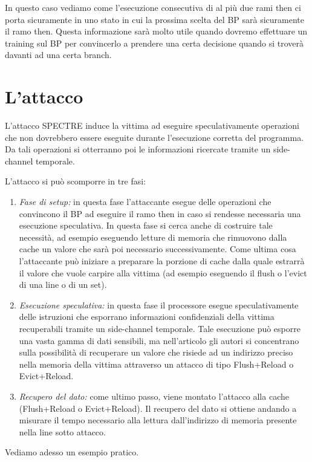 			In questo caso vediamo come l'esecuzione consecutiva di al più due rami then ci porta sicuramente in uno stato in cui la prossima scelta del \ac{BP} sarà sicuramente il ramo then. Questa informazione sarà molto utile quando dovremo effettuare un training sul \ac{BP} per convincerlo a prendere una certa decisione quando si troverà davanti ad una certa branch.
			
	\section{L'attacco}
		L'attacco SPECTRE induce la vittima ad eseguire speculativamente operazioni che non dovrebbero essere eseguite durante l'esecuzione corretta del programma. Da tali operazioni si otterranno poi le informazioni ricercate tramite un side-channel temporale.
		
		L'attacco si può scomporre in tre fasi:
		
		\begin{enumerate}
			\item \emph{Fase di setup:} in questa fase l'attaccante esegue delle operazioni che convincono il \ac{BP} ad eseguire il ramo then in caso si rendesse necessaria una esecuzione speculativa. In questa fase si cerca anche di costruire tale necessità, ad esempio eseguendo letture di memoria che rimuovono dalla cache un valore che sarà poi necessario successivamente. Come ultima cosa l'attaccante può iniziare a preparare la porzione di cache dalla quale estrarrà il valore che vuole carpire alla vittima (ad esempio eseguendo il flush o l'evict di una line o di un set).
			\item \emph{Esecuzione speculativa:} in questa fase il processore esegue speculativamente delle istruzioni che esporrano informazioni confidenziali della vittima recuperabili tramite un side-channel temporale. Tale esecuzione può esporre una vasta gamma di dati sensibili, ma nell'articolo gli autori si concentrano sulla possibilità di recuperare un valore che risiede ad un indirizzo preciso nella memoria della vittima attraverso un attacco di tipo Flush+Reload o Evict+Reload.
			\item \emph{Recupero del dato:} come ultimo passo, viene montato l'attacco alla cache (Flush+Reload o Evict+Reload). Il recupero del dato si ottiene andando a misurare il tempo necessario alla lettura dall'indirizzo di memoria presente nella line sotto attacco.
		\end{enumerate}
	
		Vediamo adesso un esempio pratico.
		
